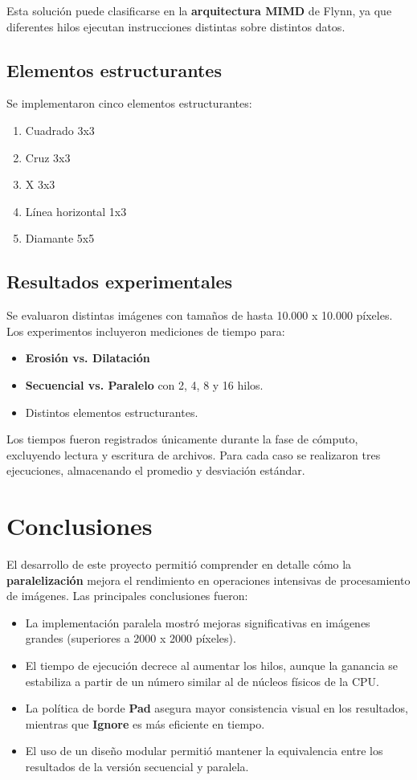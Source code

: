 \documentclass[a4paper,12pt]{article}
\begin{document}
Esta solución puede clasificarse en la \textbf{arquitectura MIMD} de Flynn, ya que
diferentes hilos ejecutan instrucciones distintas sobre distintos datos.

\subsection{Elementos estructurantes}
Se implementaron cinco elementos estructurantes:
\begin{enumerate}
    \item Cuadrado 3x3
    \item Cruz 3x3
    \item X 3x3
    \item Línea horizontal 1x3
    \item Diamante 5x5
\end{enumerate}

\subsection{Resultados experimentales}
Se evaluaron distintas imágenes con tamaños de hasta 10.000 x 10.000 píxeles.
Los experimentos incluyeron mediciones de tiempo para:
\begin{itemize}
    \item \textbf{Erosión vs. Dilatación}
    \item \textbf{Secuencial vs. Paralelo} con 2, 4, 8 y 16 hilos.
    \item Distintos elementos estructurantes.
\end{itemize}

Los tiempos fueron registrados únicamente durante la fase de cómputo, excluyendo
lectura y escritura de archivos. Para cada caso se realizaron tres ejecuciones,
almacenando el promedio y desviación estándar.

\section{Conclusiones}
El desarrollo de este proyecto permitió comprender en detalle cómo la
\textbf{paralelización} mejora el rendimiento en operaciones intensivas de procesamiento
de imágenes.  
Las principales conclusiones fueron:
\begin{itemize}
    \item La implementación paralela mostró mejoras significativas en imágenes grandes
    (superiores a 2000 x 2000 píxeles).
    \item El tiempo de ejecución decrece al aumentar los hilos, aunque la ganancia
    se estabiliza a partir de un número similar al de núcleos físicos de la CPU.
    \item La política de borde \textbf{Pad} asegura mayor consistencia visual en los resultados,
    mientras que \textbf{Ignore} es más eficiente en tiempo.
    \item El uso de un diseño modular permitió mantener la equivalencia entre los resultados
    de la versión secuencial y paralela.
\end{itemize}
\end{document}
